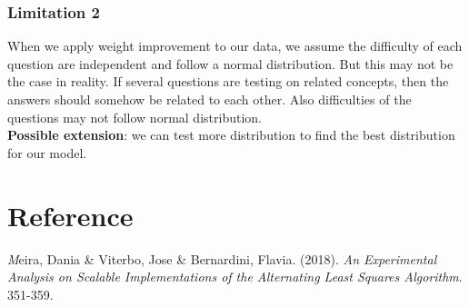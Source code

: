 \documentclass[12pt]{article}
\begin{document}
	\subsubsection*{Limitation 2}
	When we apply weight improvement to our data, we assume the difficulty of each question are independent and follow a normal distribution. But this may not be the case in reality. If several questions are testing on related concepts, then the answers should somehow be related to each other. Also difficulties of the questions may not follow normal distribution.\\
	\textbf{Possible extension}: we can test more distribution to find the best distribution for our model.
	
	\newpage
	\section*{Reference}
	\textit
	Meira, Dania \& Viterbo, Jose \& Bernardini, Flavia. (2018). \textit{An Experimental Analysis on Scalable Implementations of the Alternating Least Squares Algorithm}. 351-359.
	
\end{document}
